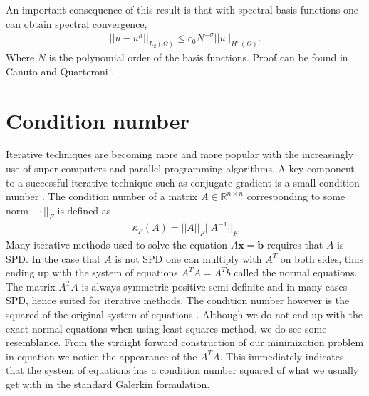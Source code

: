 An important consequence of this result is that with spectral basis functions one can obtain spectral convergence, 
\begin{align}
	||u-u^h||_{L_2(\Omega)} \leq c_0N^{-\sigma}||u||_{H^{\sigma}(\Omega)}.
	\label{eq:spectralConvergence}
\end{align}
Where $N$ is the polynomial order of the basis functions.
Proof can be found in Canuto and Quarteroni \cite{Canuto}.
%

\section{Condition number}
Iterative techniques are becoming more and more popular with the increasingly use of super computers and parallel programming algorithms. A key component to a successful iterative technique such as conjugate gradient is a small condition number \cite{Saad}. The condition number of a matrix $A \in \mathbb{R}^{n\times n}$ corresponding to some norm $||\cdot||_F$ is defined as 
\begin{align}
	\kappa_F(A) = ||A||_F||A^{-1}||_F
\end{align}
Many iterative methods used to solve the equation $A\mathbf{x}=\mathbf{b}$ requires that $A$ is SPD. In the case that $A$ is not SPD one can multiply with $A^T$ on both sides, thus ending up with the system of equations $A^TA = A^Tb$ called the normal equations. The matrix $A^TA$ is always symmetric positive semi-definite and in many cases SPD, hence suited for iterative methods. The condition number however is the squared of the original system of equations \cite{DM}. Although we do not end up with the exact normal equations when using least squares method, we do see some resemblance. From the straight forward construction of our minimization problem in equation we notice the appearance of the $A^TA$. This immediately indicates that the system of equations has a condition number squared of what we usually get with in the standard Galerkin formulation. 
%
%
